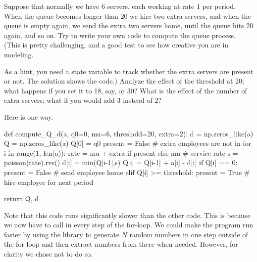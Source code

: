 \begin{exercise}
  Suppose that normally we have 6 servers, each working at rate $1$ per period. When the queue becomes longer than 20 we hire two extra servers, and when the queue is empty again, we send the extra two servers home, until the queue hits 20 again, and so on. Try to write your own code to compute the queue process. (This is pretty challenging, and a good test to see how creative you are in modeling.
  \begin{hint}
  As a hint, you need a state variable to track whether the extra servers are present or not. The solution shows the code.) Analyze the effect of the threshold at 20; what happens if you set it to 18, say, or 30? What is the effect of the number of extra servers; what if you would add 3 instead of 2?
  \end{hint}

  \begin{solution}
Here is one way.
    \begin{pyverbatim}
def compute_Q_d(a, q0=0, mu=6, threshold=20, extra=2):
    d = np.zeros_like(a)
    Q = np.zeros_like(a)
    Q[0] = q0
    present = False # extra employees are not in
    for i in range(1, len(a)):
        rate = mu + extra if present else mu # service rate
        s = poisson(rate).rvs()
        d[i] = min(Q[i-1],s)
        Q[i] = Q[i-1] + a[i] - d[i]
        if Q[i] == 0:
            present = False # send employee home
        elif Q[i] >= threshold:
            present = True # hire employee for next period
    
    return Q, d
    
    \end{pyverbatim}


    Note that this code runs significantly  slower than the other code. This is because  we now  have to call  in every step of the for-loop. We could make the program run faster by using the  library to generate $N$ random numbers in one step outside of the for loop and then extract numbers from there when needed. However, for clarity we chose not to do so.
  \end{solution}
  
\end{exercise}


